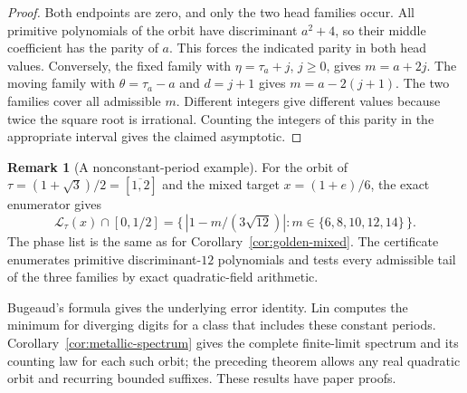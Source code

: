 \documentclass[11pt]{amsart}
\theoremstyle{definition}
\newtheorem{remark}[theorem]{Remark}
\theoremstyle{remark}
\numberwithin{equation}{section}
\begin{document}
\begin{proof}
Both endpoints are zero, and only the two head families occur.
All primitive polynomials of the orbit have discriminant $a^2+4$,
so their middle coefficient has the parity of $a$. This forces the
indicated parity in both head values. Conversely, the fixed family
with $\eta=\tau_a+j$, $j\ge0$, gives $m=a+2j$. The moving family with
$\theta=\tau_a-a$ and $d=j+1$ gives $m=a-2(j+1)$.
The two families cover all admissible $m$. Different integers give
different values because twice the square root is irrational.
Counting the integers of this parity in the appropriate interval
gives the claimed asymptotic.
\end{proof}

\begin{remark}[A nonconstant-period example]
For the orbit of $\tau=(1+\sqrt3)/2=[\overline{1,2}]$ and the
mixed target $x=(1+e)/6$, the exact enumerator gives
\[
 \mathcal L_\tau(x)\cap[0,1/2]
   =\{\,|1-m/(3\sqrt{12})|:m\in\{6,8,10,12,14\}\,\}.
\]
The phase list is the same as for Corollary~\ref{cor:golden-mixed}.
The certificate enumerates primitive discriminant-$12$ polynomials
and tests every admissible tail of the three families by exact
quadratic-field arithmetic.
\end{remark}

Bugeaud's formula \cite[(3.4)]{BugeaudQuad} gives the underlying error
identity. Lin \cite[Lemma~4.2]{Lin2018} computes the minimum for
diverging digits for a class that includes these constant periods.
Corollary~\ref{cor:metallic-spectrum} gives the complete finite-limit
spectrum and its counting law for each such orbit; the preceding
theorem allows any real quadratic orbit and recurring bounded
suffixes. These results have paper proofs.
\end{document}
